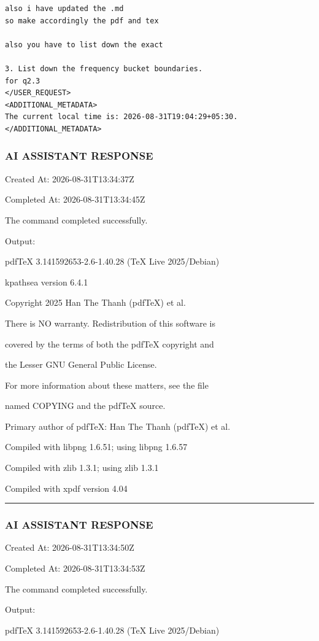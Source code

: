 \documentclass[11pt,a4paper]{article}
\begin{document}
{\begin{lstlisting}[language=text]
also i have updated the .md 
so make accordingly the pdf and tex 

also you have to list down the exact 

3. List down the frequency bucket boundaries.
for q2.3
</USER_REQUEST>
<ADDITIONAL_METADATA>
The current local time is: 2026-08-31T19:04:29+05:30.
</ADDITIONAL_METADATA>
\end{lstlisting}


\subsubsection{AI ASSISTANT RESPONSE}

Created At: 2026-08-31T13:34:37Z

Completed At: 2026-08-31T13:34:45Z


The command completed successfully.

Output:

pdfTeX 3.141592653-2.6-1.40.28 (TeX Live 2025/Debian)

kpathsea version 6.4.1

Copyright 2025 Han The Thanh (pdfTeX) et al.

There is NO warranty.  Redistribution of this software is

covered by the terms of both the pdfTeX copyright and

the Lesser GNU General Public License.

For more information about these matters, see the file

named COPYING and the pdfTeX source.

Primary author of pdfTeX: Han The Thanh (pdfTeX) et al.

Compiled with libpng 1.6.51; using libpng 1.6.57

Compiled with zlib 1.3.1; using zlib 1.3.1

Compiled with xpdf version 4.04


\hrule

\subsubsection{AI ASSISTANT RESPONSE}

Created At: 2026-08-31T13:34:50Z

Completed At: 2026-08-31T13:34:53Z


The command completed successfully.

Output:

pdfTeX 3.141592653-2.6-1.40.28 (TeX Live 2025/Debian)

}
\end{document}
